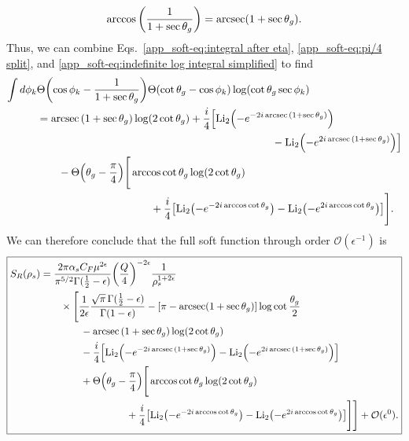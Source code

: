 \documentclass[../thesis.tex]{subfiles}
\providecommand{\Li}{\mathrm{Li}}
\providecommand{\cO}{\mathcal{O}}
\begin{document}
	\begin{equation}
		\arccos\qty(\frac{1}{1 + \sec\theta_g}) = \arcsec(1 + \sec\theta_g).
	\end{equation}
	Thus, we can combine Eqs.~\ref{app_soft-eq:integral after eta}, \ref{app_soft-eq:pi/4 split}, and \ref{app_soft-eq:indefinite log integral simplified} to find
	\begin{equation}
	\begin{aligned}
		\int d\phi_k &\Theta\qty(\cos\phi_k - \frac{1}{1+\sec\theta_g})\Theta(\cot\theta_g - \cos\phi_k) \log(\cot\theta_g \sec\phi_k ) \\
		&= \arcsec\qty(1 + \sec\theta_g) \log(2\cot\theta_g) + \frac{i}{4}\Big [\Li_2\qty(-e^{-2i\arcsec\qty(1 + \sec\theta_g)}) \\
			&\hspace{7.75cm}- \Li_2\qty(-e^{2i\arcsec\qty(1 + \sec\theta_g)}) \Big] \\
		&\qquad- \Theta\qty(\theta_g - \frac{\pi}{4})\Bigg[ \arccos\cot\theta_g \log(2\cot\theta_g) \\
			&\hspace{3.75cm}+ \frac{i}{4}\qty[\Li_2\qty(-e^{-2i\arccos\cot\theta_g}) - \Li_2\qty(-e^{2i\arccos\cot\theta_g})] \Bigg].
	\end{aligned}
	\end{equation}
	We can therefore conclude that the full soft function through order $\cO(\epsilon^{-1})$ is
	\begin{equation}\label{app_soft-eq:full soft function}
	\boxed{
	\begin{aligned}
		S_R(\rho_s) &= \frac{2\pi\alpha_s C_F\mu^{2\epsilon}}{\pi^{5/2} \Gamma(\frac{1}{2} - \epsilon)}\qty(\frac{Q}{4})^{-2\epsilon} \frac{1}{\rho_s^{1 + 2\epsilon}} \\
			&\qquad\times \Bigg[\frac{1}{2\epsilon}\frac{\sqrt{\pi} \, \Gamma(\frac{1}{2} - \epsilon)}{\Gamma(1 - \epsilon)} - \qty[\pi - \arcsec(1 + \sec\theta_g)]\log\cot\frac{\theta_g}{2} \\
			&\qquad\qquad - \arcsec\qty(1 + \sec\theta_g) \log(2\cot\theta_g) \\
			&\qquad\qquad - \frac{i}{4}\qty[\Li_2\qty(-e^{-2i\arcsec\qty(1 + \sec\theta_g)}) - \Li_2\qty(-e^{2i\arcsec\qty(1 + \sec\theta_g)})] \\
			&\qquad\qquad+ \Theta\qty(\theta_g - \frac{\pi}{4})\Bigg[ \arccos\cot\theta_g \log(2\cot\theta_g) \\
			&\hspace{3cm}+ \frac{i}{4}\qty[\Li_2\qty(-e^{-2i\arccos\cot\theta_g}) - \Li_2\qty(-e^{2i\arccos\cot\theta_g})] \Bigg] \Bigg] + \cO(\epsilon^0).
	\end{aligned}
	}
	\end{equation}
\end{document}
